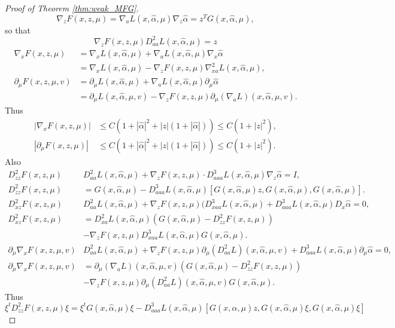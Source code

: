 \documentclass[12,english]{amsart}
\theoremstyle{plain}
\theoremstyle{definition}
\theoremstyle{plain}
\theoremstyle{plain}
\theoremstyle{remark}
\newcommand{\af}{\alpha}
\begin{document}
\begin{proof}[Proof of Theorem \ref{thm:weak_MFG}]
\begin{equation}
  \nabla_{z}F(x,z,\mu)=\nabla_aL(x,\hat\af,\mu)\nabla_z\hat\af
  =z^TG(x,\hat\af,\mu),\label{eq:D_eta}
\end{equation}
so that
\[\nabla_{z}F(x,z,\mu)D_{aa}^2L(x,\hat\af,\mu)=z\]
\begin{align*}
  \nabla_xF(x,z,\mu)&=\nabla_xL(x,\hat\af,\mu)+\nabla_aL(x,\hat\af,\mu)\nabla_x\hat\af\\
  &=\nabla_xL(x,\hat\af,\mu) -\nabla_zF(x,z,\mu)\nabla_{xa}^2L(x,\hat\af,\mu),\\
    \partial_\mu F(x,z,\mu,v)&=\partial_\mu L(x,\hat\af,\mu)+ \nabla_aL(x,\hat\af,\mu)\partial_\mu\hat\af\\
&  =\partial_\mu L(x,\hat\af,\mu,v) -\nabla_zF(x,z,\mu)\partial_\mu(\nabla_aL)(x,\hat\af,\mu,v).
\end{align*}
Thus
\begin{align*}
  |\nabla_xF(x,z,\mu)|&\le C(1+|\hat\af|^2+|z|(1+|\hat\af|))\le C(1+|z|^2),\\
|\partial_\mu F(x,z,\mu)|&\le C(1+|\hat\af|^2+|z|(1+|\hat\af|))\le C(1+|z|^2).
\end{align*}
Also
\begin{align*}
  D_{zz}^2F(x,z,\mu)&D_{aa}^2L(x,\hat\af,\mu)+
  \nabla_{z}F(x,z,\mu)\cdot D_{aaa}^ 3L(x,\hat\af,\mu) \nabla_z\hat\af=I,\\
D_{zz}^2F(x,z,\mu)&=G(x,\hat\af,\mu)-D_{aaa}^ 3L(x,\hat\af,\mu) [G(x,\hat\af,\mu)z, G(x,\hat\af,\mu),G(x,\hat\af,\mu)].\\
D_{xz}^2F(x,z,\mu)&D_{aa}^2L(x,\hat\af,\mu)+
  \nabla_{z}F(x,z,\mu)(D_{xaa}^ 3L(x,\hat\af,\mu)+ D_{aaa}^ 3L(x,\hat\af,\mu) D_x\hat\af=0,\\
  D_{xz}^2F(x,z,\mu)&=D^2_{xa}L(x,\hat\af,\mu)(G(x,\hat\af,\mu)
 -D_{zz}^2F(x,z,\mu))\\&-\nabla_zF(x,z,\mu)D_{xaa}^3L(x,\hat\af,\mu)G(x,\hat\af,\mu).\\
\partial_\mu\nabla_xF(x,z,\mu,v)&D_{aa}^2L(x,\hat\af,\mu)+
  \nabla_{z}F(x,z,\mu)\partial_\mu(D_{aa}^2L)(x,\hat\af,\mu,v)+ D_{aaa}^ 3L(x,\hat\af,\mu)\partial_\mu\hat\af=0,\\
  \partial_\mu\nabla_xF(x,z,\mu,v)&=\partial_\mu(\nabla_aL)(x,\hat\af,\mu,v)(G(x,\hat\af,\mu)
 -D_{zz}^2F(x,z,\mu))\\&- \nabla_{z}F(x,z,\mu)\partial_\mu(D_{aa}^2L) (x,\hat\af,\mu,v)G(x,\hat\af,\mu).
\end{align*}
Thus
\begin{equation}
\xi^t D_{zz}^2F(x,z,\mu)\xi=\xi^tG(x,\hat\af,\mu)\xi-D_{aaa}^ 3L(x,\hat\af,\mu) [G(x,\hat\af,\mu)z, G(x,\hat\af,\mu)\xi,G(x,\hat\af,\mu)\xi]\label{eq:F1}

\end{equation}
\end{proof}
\end{document}
